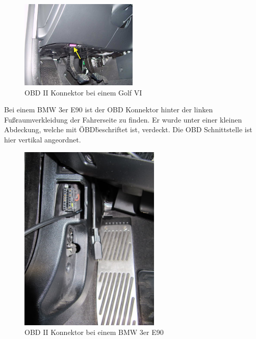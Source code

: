 \begin{figure}[!htb]\centering
	\includegraphics[width=0.5\textwidth]{images/golfobd}
	\caption{OBD II Konnektor bei einem Golf VI \cite{SIMR.CH2-obd2.GolfOBD}}\label{Fig:Data3}
\end{figure}

Bei einem BMW 3er E90 ist der OBD Konnektor hinter der linken Fußraumverkleidung der Fahrerseite zu finden. Er wurde unter einer kleinen Abdeckung, welche mit \"OBD\" beschriftet ist, verdeckt. Die OBD Schnittstelle ist hier vertikal angeordnet.

\begin{figure}[!htb]\centering
	\includegraphics[width=0.6\textwidth]{images/3erobd}
	\caption{OBD II Konnektor bei einem BMW 3er E90 \cite{SIMR.CH2-obd2.3erOBD}}\label{Fig:Data3}
\end{figure}

